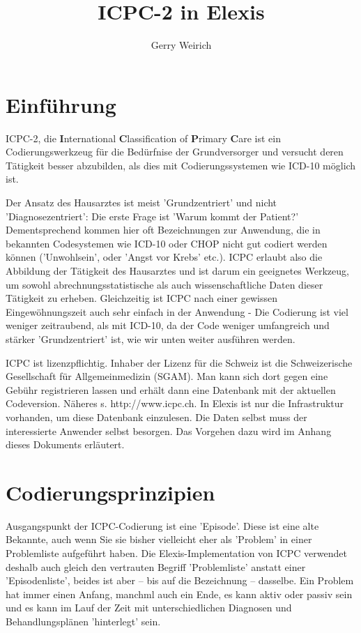 \documentclass[a4paper]{scrartcl}
\begin{document}
\title{ICPC-2 in Elexis}
\author{Gerry Weirich}
\maketitle

\section{Einführung}
ICPC-2, die \textbf{I}nternational \textbf{C}lassification of \textbf{P}rimary \textbf{C}are ist ein Codierungswerkzeug für die Bedürfnise der Grundversorger und versucht deren Tätigkeit besser abzubilden, als dies mit Codierungssystemen wie ICD-10 möglich ist.

\medskip 

Der Ansatz des Hausarztes ist meist 'Grundzentriert' und nicht 'Diagnosezentriert': Die erste Frage ist 'Warum kommt der Patient?' Dementsprechend kommen hier oft Bezeichnungen zur Anwendung, die in bekannten Codesystemen wie ICD-10 oder CHOP nicht gut codiert werden können ('Unwohlsein', oder 'Angst vor Krebs' etc.). ICPC erlaubt also die Abbildung der Tätigkeit des Hausarztes und ist darum ein geeignetes Werkzeug, um sowohl abrechnungsstatistische als auch wissenschaftliche Daten dieser Tätigkeit zu erheben. Gleichzeitig ist ICPC nach einer gewissen Eingewöhnungszeit auch sehr einfach in der Anwendung - Die Codierung ist viel weniger zeitraubend, als mit ICD-10, da der Code weniger umfangreich und stärker 'Grundzentriert' ist, wie wir unten weiter ausführen werden.

\medskip
ICPC ist lizenzpflichtig. Inhaber der Lizenz für die Schweiz ist die Schweizerische Gesellschaft für Allgemeinmedizin (SGAM). Man kann sich dort gegen eine Gebühr registrieren lassen und erhält dann eine Datenbank mit der aktuellen Codeversion. Näheres s. http://www.icpc.ch. In Elexis ist nur die Infrastruktur vorhanden, um diese Datenbank einzulesen. Die Daten selbst muss der interessierte Anwender selbst besorgen. Das Vorgehen dazu wird im Anhang dieses Dokuments erläutert.

\section{Codierungsprinzipien}
 Ausgangspunkt der ICPC-Codierung ist eine 'Episode'. Diese ist eine alte Bekannte, auch wenn Sie sie bisher vielleicht eher als 'Problem' in einer Problemliste aufgeführt haben. Die Elexis-Implementation von ICPC verwendet deshalb auch gleich den vertrauten Begriff 'Problemliste' anstatt einer 'Episodenliste', beides ist aber -- bis auf die Bezeichnung -- dasselbe. Ein Problem hat immer einen Anfang, manchml auch ein Ende, es kann aktiv oder passiv sein und es kann im Lauf der Zeit mit unterschiedlichen Diagnosen und Behandlungsplänen 'hinterlegt' sein.
\end{document}
